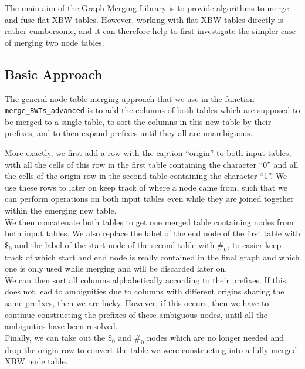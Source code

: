 \documentclass[a4paper,12pt,twoside,BCOR=10mm]{scrbook}
\begin{document}
The main aim of the Graph Merging Library is to provide algorithms
to merge and fuse flat XBW tables.
However, working with flat XBW tables directly is rather cumbersome,
and it can therefore help to first investigate the simpler case
of merging two node tables.

\subsection{Basic Approach}

The general node table merging approach that we use
in the function \texttt{merge\_BWTs\_advanced}
is to add the columns of both tables which are supposed to be merged to a single table,
to sort the columns in this new table by their prefixes,
and to then expand prefixes until they all are unambiguous.

More exactly, we first add a row with the caption “origin” to both input tables,
with all the cells of this row in the first table containing the character “0” and
all the cells of the origin row in the second table containing the character “1”.
We use these rows to later on keep track of where a node came from,
such that we can perform operations on both input tables even while
they are joined together within the emerging new table. \\
We then concatenate both tables to get one merged table containing
nodes from both input tables.
We also replace the label of the end node of the first table with $\$_0$ and
the label of the start node of the second table with $\#_0$, to easier keep track
of which start and end node is really contained in the final graph
and which one is only used while merging and will be discarded later on. \\
We can then sort all columns alphabetically according to their prefixes.
If this does not lead to ambiguities due to columns with different origins
sharing the same prefixes, then we are lucky. However, if this occurs,
then we have to continue constructing the prefixes of these ambiguous nodes,
until all the ambiguities have been resolved. \\
Finally, we can take out the $\$_0$ and $\#_0$ nodes which are no longer needed
and drop the origin row to convert the table we were constructing into
a fully merged XBW node table.


%
%
\end{document}
